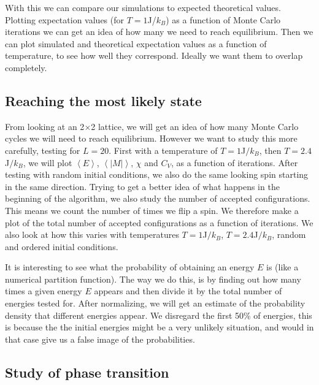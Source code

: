 \documentclass[reprint, english,notitlepage,nofootinbib]{revtex4-1}  %
\begin{document}
With this we can compare our simulations to expected theoretical values. Plotting expectation values (for $T=1$J/$k_B$) as a function of Monte Carlo iterations we can get an idea of how many we need to reach equilibrium. Then we can plot simulated and theoretical expectation values as a function of temperature, to see how well they correspond. Ideally we want them to overlap completely.

\subsection{Reaching the most likely state}
From looking at an 2$\times$2 lattice, we will get an idea of how many Monte Carlo cycles we will need to reach equilibrium. However we want to study this more carefully, testing for $L=20$. First with a temperature of $T = 1 $J$/k_B$, then $T = 2.4 $J$/k_B$, we will plot $\left<E\right>$, $\left<|M|\right>$, $\chi$ and $C_V$, as a function of iterations. After testing with random initial conditions, we also do the same looking spin starting in the same direction. Trying to get a better idea of what happens in the beginning of the algorithm, we also study the number of accepted configurations. This means we count the number of times we flip a spin. We therefore make a plot of the total number of accepted configurations as a function of iterations. We also look at how this varies with temperatures $T = 1$J$/k_B$, $T=2.4$J$/k_B$, random and ordered initial conditions.

It is interesting to see what the probability of obtaining an energy $E$ is (like a numerical partition function). The way we do this, is by finding out how many times a given energy $E$ appears and then divide it by the total number of energies tested for. After normalizing, we will get an estimate of the probability density that different energies appear. We disregard the first 50\% of energies, this is because the the initial energies might be a very unlikely situation, and would in that case give us a false image of the probabilities.

\subsection{Study of phase transition}
\end{document}
